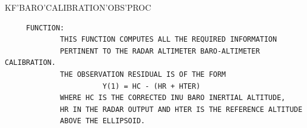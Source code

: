 \begin{frame}
KF'BARO'CALIBRATION'OBS'PROC
\begin{verbatim}
     FUNCTION:
             THIS FUNCTION COMPUTES ALL THE REQUIRED INFORMATION
             PERTINENT TO THE RADAR ALTIMETER BARO-ALTIMETER CALIBRATION.
             THE OBSERVATION RESIDUAL IS OF THE FORM
                       Y(1) = HC - (HR + HTER)
             WHERE HC IS THE CORRECTED INU BARO INERTIAL ALTITUDE,
             HR IN THE RADAR OUTPUT AND HTER IS THE REFERENCE ALTITUDE
             ABOVE THE ELLIPSOID.


\end{verbatim}
\end{frame}
